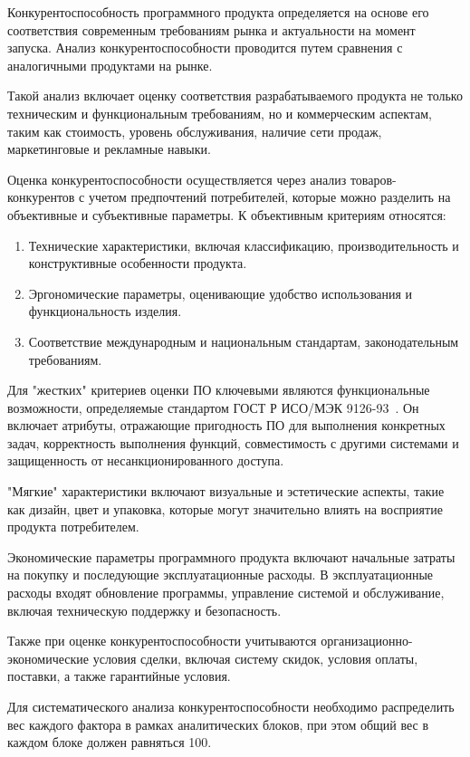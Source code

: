 Конкурентоспособность программного продукта определяется на основе его соответствия современным требованиям рынка и актуальности на момент запуска. Анализ конкурентоспособности проводится путем сравнения с аналогичными продуктами на рынке.

Такой анализ включает оценку соответствия разрабатываемого продукта не только техническим и функциональным требованиям, но и коммерческим аспектам, таким как стоимость, уровень обслуживания, наличие сети продаж, маркетинговые и рекламные навыки.

Оценка конкурентоспособности осуществляется через анализ товаров-конкурентов с учетом предпочтений потребителей, которые можно разделить на объективные и субъективные параметры. К объективным критериям относятся:

\begin{enumerate}
    \item Технические характеристики, включая классификацию, производительность и конструктивные особенности продукта.
    \item Эргономические параметры, оценивающие удобство использования и функциональность изделия.
    \item Соответствие международным и национальным стандартам, законодательным требованиям.
\end{enumerate}

Для "жестких" критериев оценки ПО ключевыми являются функциональные возможности, определяемые стандартом ГОСТ Р ИСО/МЭК 9126-93~\cite{bib:iso_9126}. Он включает атрибуты, отражающие пригодность ПО для выполнения конкретных задач, корректность выполнения функций, совместимость с другими системами и защищенность от несанкционированного доступа.

"Мягкие" характеристики включают визуальные и эстетические аспекты, такие как дизайн, цвет и упаковка, которые могут значительно влиять на восприятие продукта потребителем.

Экономические параметры программного продукта включают начальные затраты на покупку и последующие эксплуатационные расходы. В эксплуатационные расходы входят обновление программы, управление системой и обслуживание, включая техническую поддержку и безопасность.

Также при оценке конкурентоспособности учитываются организационно-экономические условия сделки, включая систему скидок, условия оплаты, поставки, а также гарантийные условия.

Для систематического анализа конкурентоспособности необходимо распределить вес каждого фактора в рамках аналитических блоков, при этом общий вес в каждом блоке должен равняться 100.

